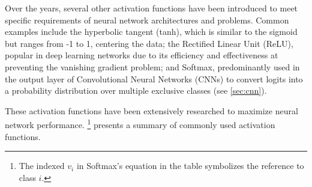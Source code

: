 Over the years, several other activation functions have been introduced to meet specific requirements of neural network architectures and problems. Common examples
include the hyperbolic tangent (tanh), which is similar to the sigmoid but ranges from -1 to 1, centering the data; the Rectified Linear Unit (ReLU), popular in deep
learning networks due to its efficiency and effectiveness at preventing the vanishing gradient problem\cite{VanishingGradientProblem}; and Softmax, predominantly used
in the output layer of Convolutional Neural Networks (CNNs) to convert logits into a probability distribution over multiple exclusive classes (see \cref{sec:cnn}).

These activation functions have been extensively researched to maximize neural network performance\cite{dubeyActivationFunctionsDeep2022,sharmaACTIVATIONFUNCTIONSNEURAL2020}.
\footnote{The indexed $v_i$ in Softmax's equation in the table symbolizes the reference to class $i$.}
presents a summary of commonly used activation functions.

